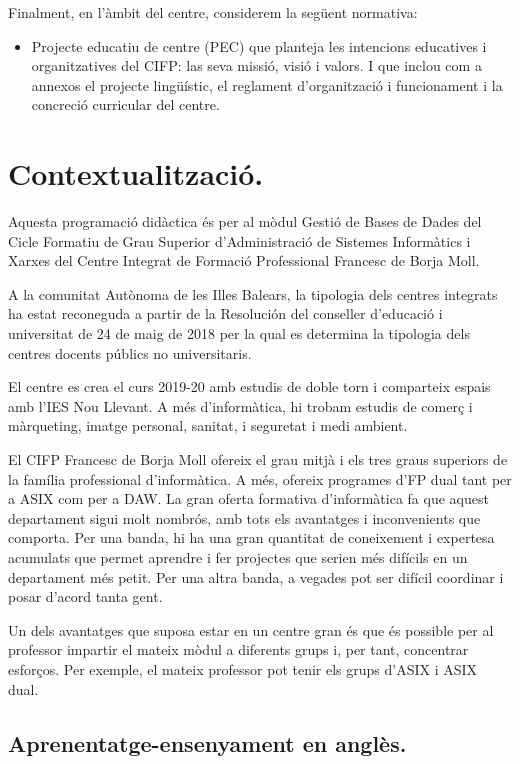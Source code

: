 \documentclass[catalan, a4paper, 12pt, titlepage]{article}
\begin{document}
Finalment, en l'àmbit del centre, considerem la següent normativa:
\begin{itemize}
	\item Projecte educatiu de centre (PEC) que planteja les intencions educatives i organitzatives del CIFP: las seva missió, visió i valors. I que inclou com a annexos el projecte lingüístic, el reglament d'organització i funcionament i la concreció curricular del centre.
\end{itemize}

\section{Contextualització.}
\label{sec:contextualització}

Aquesta programació didàctica és per al mòdul Gestió de Bases de Dades del Cicle Formatiu de Grau Superior d'Administració de Sistemes Informàtics i Xarxes del Centre Integrat de Formació Professional Francesc de Borja Moll. 

A la comunitat Autònoma de les Illes Balears, la tipologia dels centres integrats ha estat reconeguda a partir de la Resolución del conseller d'educació i universitat de 24 de maig de 2018 per la qual es determina la tipologia dels centres docents públics no universitaris.

El centre es crea el curs 2019-20 amb estudis de doble torn i comparteix espais amb l'IES Nou Llevant. A més d'informàtica, hi trobam estudis de comerç i màrqueting, imatge personal, sanitat, i seguretat i medi ambient.

El CIFP Francesc de Borja Moll ofereix el grau mitjà i els tres graus superiors de la família professional d'informàtica. 
A més, ofereix programes d'FP dual tant per a ASIX com per a DAW.
La gran oferta formativa d'informàtica fa que aquest departament sigui molt nombrós, amb tots els avantatges i inconvenients que comporta.
Per una banda, hi ha una gran quantitat de coneixement i expertesa acumulats que permet aprendre i fer projectes que serien més difícils en un departament més petit.
Per una altra banda, a vegades pot ser difícil coordinar i posar d'acord tanta gent.

Un dels avantatges que suposa estar en un centre gran és que és possible per al professor impartir el mateix mòdul a diferents grups i, per tant, concentrar esforços.
Per exemple, el mateix professor pot tenir els grups d'ASIX i ASIX dual.

\subsection{Aprenentatge-ensenyament en anglès.}
\end{document}
